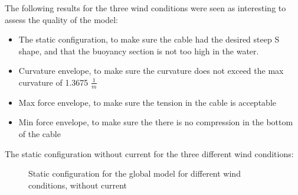 The following results for the three wind conditions were seen as interesting to assess the quality of the model:
\begin{itemize}
    \item The static configuration, to make sure the cable had the desired steep S shape, and that the buoyancy section is not too high in the water.
    \item Curvature envelope, to make sure the curvature does not exceed the max curvature of 1.3675 $\frac{1}{m}$
    \item Max force envelope, to make sure the tension in the cable is acceptable
    \item Min force envelope, to make sure the there is no compression in the bottom of the cable
\end{itemize}

The static configuration without current for the three different wind conditions: 
\begin{figure}[H]
\hfill
{}\hfill
  \hfill
\caption{Static configuration for the global model for different wind conditions, without current}
\label{fig:statcon}
\end{figure}

